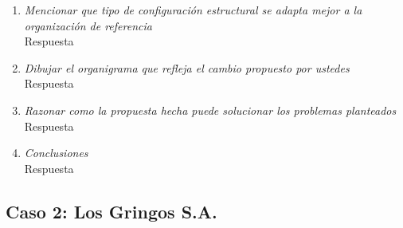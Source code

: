 \documentclass[a4paper,10pt]{article}
\begin{document}
\begin{enumerate}
			\item \textit{Mencionar que tipo de configuración estructural se adapta mejor a la organización de referencia}\\
			Respuesta
						
			\item \textit{Dibujar el organigrama que refleja el cambio propuesto por ustedes}\\
			Respuesta
						
			\item \textit{Razonar como la propuesta hecha puede solucionar los problemas planteados}\\
			Respuesta
			
			\item \textit{Conclusiones}\\
			Respuesta
			
			\end{enumerate}
	\subsection{Caso 2: Los Gringos S.A.}
\end{document}
